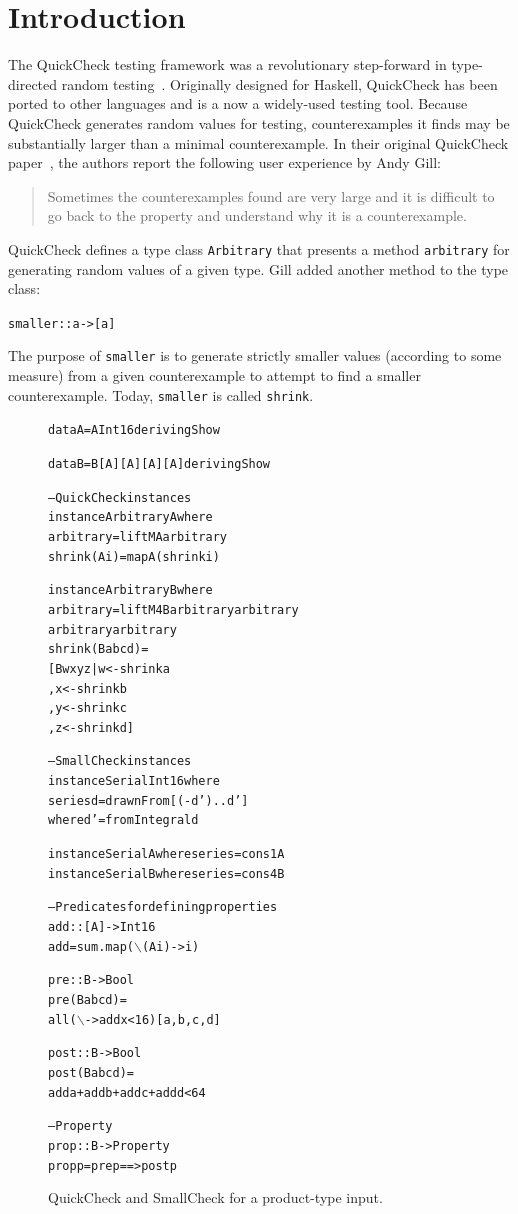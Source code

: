 \documentclass[10pt]{sigplanconf}
\newenvironment{code}{\begin{alltt}}{\end{alltt}}
\newcommand{\ttp}[1]{\texttt{#1}}
\begin{document}
\section{Introduction}\label{sec:intro}
The QuickCheck testing framework was a revolutionary step-forward in
type-directed random testing~\cite{qc}.  Originally designed for Haskell,
QuickCheck has been ported to other languages and is a now a widely-used testing
tool.  Because QuickCheck generates random values for testing, counterexamples
it finds may be substantially larger than a minimal counterexample.  In their
original QuickCheck paper~\cite{qc}, the authors report the following user
experience by Andy Gill:
%
\begin{quote}
Sometimes the counterexamples found are very large and it is difficult to go
back to the property and understand why it is a counterexample.
\end{quote}
%
\noindent
QuickCheck defines a type class \ttp{Arbitrary} that presents a method
\ttp{arbitrary} for generating random values of a given type.  Gill added another
method to the type class:
%
\begin{code}
smaller :: a -> [a]
\end{code}
%
\noindent
The purpose of \ttp{smaller} is to generate strictly smaller values (according to
some measure) from a given counterexample to attempt to find a smaller
counterexample.  Today, \ttp{smaller} is called \ttp{shrink}.

\begin{figure}[ht]
\begin{code}
data A = A Int16 deriving Show

data B = B [A] [A] [A] [A] deriving Show

-- QuickCheck instances
instance Arbitrary A where
  arbitrary    = liftM A arbitrary
  shrink (A i) = map A (shrink i)

instance Arbitrary B where
  arbitrary = liftM4 B arbitrary arbitrary
                       arbitrary arbitrary
  shrink (B a b c d) =
    [ B w x y z | w <- shrink a
                , x <- shrink b
                , y <- shrink c
                , z <- shrink d ]

-- SmallCheck instances
instance Serial Int16 where
  series d = drawnFrom [(-d')..d']
    where d' = fromIntegral d

instance Serial A where series = cons1 A
instance Serial B where series = cons4 B

-- Predicates for defining properties
add :: [A] -> Int16
add = sum . map (\(\backslash\)(A i) -> i)

pre :: B -> Bool
pre (B a b c d) =
  all (\(\backslash\) -> add x < 16) [a, b, c, d]

post :: B -> Bool
post (B a b c d) =
  add a + add b + add c + add d < 64

-- Property
prop :: B -> Property
prop p = pre p ==> post p
\end{code}
  \caption{QuickCheck and SmallCheck for a product-type input.}
  \label{fig:initial}
\end{figure}
\end{document}
